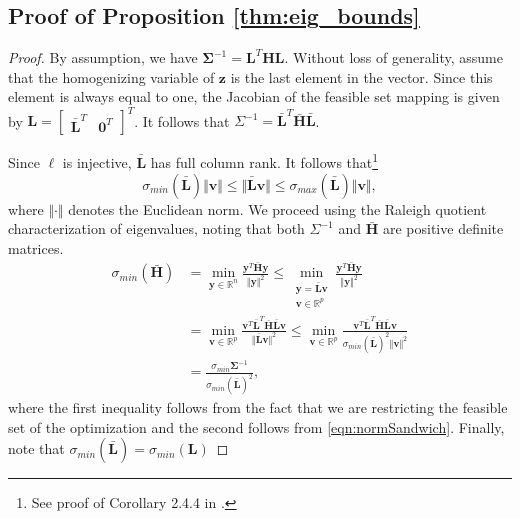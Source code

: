 \documentclass[lettersize,journal]{IEEEtran}
\begin{document}
{\subsection{Proof of Proposition \ref{thm:eig_bounds}}\label{App:lemma2Proof}

\begin{proof}
By assumption, we have $\bm{\Sigma}^{-1} = \bm{L}^T\bm{H}\bm{L}$. Without loss of generality, assume that the homogenizing variable of $\bm{z}$ is the last element in the vector. Since this element is always equal to one, the Jacobian of the feasible set mapping is given by $\bm{L} = \begin{bmatrix}
	\bar{\bm{L}}^T & \bm{0}^T
\end{bmatrix}^T$. It follows that ${\Sigma}^{-1} = \bar{\bm{L}}^T\bar{\bm{H}}\bar{\bm{L}}$.

Since $\bm{\ell}$ is injective, $\bar{\bm{L}}$ has full column rank. It follows that\footnote{See proof of Corollary 2.4.4 in \cite{golubMatrixComputations2013}.}
\begin{equation}\label{eqn:normSandwich}
	\sigma_{min}(\bar{\bm{L}}) \Vert\bm{v}\Vert \leq  \Vert\bar{\bm{L}}\bm{v}\Vert \leq \sigma_{max}(\bar{\bm{L}})\Vert\bm{v}\Vert,
\end{equation}
where $\Vert\cdot\Vert$ denotes the Euclidean norm. We proceed using the Raleigh quotient characterization of eigenvalues, noting that both $\Sigma^{-1}$ and $\bar{\bm{H}}$ are positive definite matrices.
\begin{align*}
	\sigma_{min}(\bar{\bm{H}}) &= \min\limits_{\bm{y}\in\mathbb{R}^n} \frac{\bm{y}^T \bar{\bm{H}} \bm{y}}{\Vert\bm{y}\Vert^2} 
	\leq \min\limits_{\substack{\bm{y}=\bar{\bm{L}}\bm{v}\\\bm{v}\in\mathbb{R}^p}} \frac{\bm{y}^T \bar{\bm{H}} \bm{y}}{\Vert\bm{y}\Vert^2} \\&= \min\limits_{\bm{v}\in\mathbb{R}^p} \frac{\bm{v}^T \bar{\bm{L}}^T\bar{\bm{H}}\bar{\bm{L}} \bm{v}}{\Vert\bar{\bm{L}}\bm{v}\Vert^2 }  
	\leq \min\limits_{\bm{v}\in\mathbb{R}^p} \frac{\bm{v}^T \bar{\bm{L}}^T\bar{\bm{H}}\bar{\bm{L}} \bm{v}}{\sigma_{min}(\bar{\bm{L}})^2\Vert\bm{v}\Vert^2 } 
	\\&= \frac{\sigma_{min}{\bm{\Sigma}^{-1}}}{\sigma_{min}(\bar{\bm{L}})^2},
\end{align*}
where the first inequality follows from the fact that we are restricting the feasible set of the optimization and the second follows from \eqref{eqn:normSandwich}. Finally, note that $\sigma_{min}(\bar{\bm{L}}) = \sigma_{min}(\bm{L})$


\end{proof}}
\end{document}
